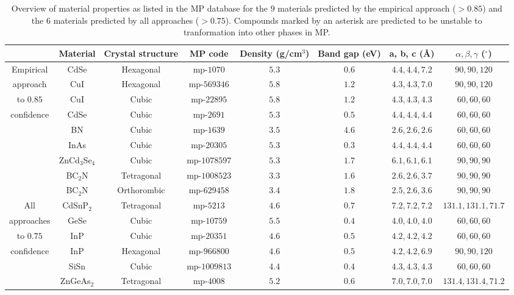 \documentclass[superscriptaddress,unsortedaddress,
 amsmath,amssymb,
 aps,
]{revtex4-2}
\begin{document}
\begin{table}[t]
    \centering 
    \caption{Overview of material properties as listed in the MP database for the $9$ materials predicted by the empirical approach ($>0.85$) and the $6$ materials predicted by all approaches ($>0.75$). Compounds marked by an asterisk are predicted to be unstable to tranformation into other phases in MP. }
    \begin{tabular}{c|c c c c c c c }
      & Material & Crystal structure & MP code & Density (g/cm$^3$) & Band gap (eV) & a, b, c (\AA) & $\alpha,\beta,\gamma$ ($^\circ$) \\
    \hline 
    Empirical & CdSe & Hexagonal & mp-$1070$ & $5.3$ & $0.6$ & $4.4,4.4,7.2$ & $90,90,120$ \\
    approach  & CuI & Hexagonal & mp-$569346$ & $5.8$ & $1.2$ & $4.3,4.3,7.0$ & $90,90,120$ \\ 
    to $0.85$  & CuI & Cubic & mp-$22895$ & $5.8$ & $1.2$ & $4.3,4.3,4.3$ & $60,60,60$  \\ 
    confidence & CdSe & Cubic & mp-$2691$ & $5.3$ & $0.5$ & $4.4,4.4,4.4$ & $60,60,60$  \\
     & BN & Cubic & mp-$1639$ & $3.5$ & $4.6$ & $2.6,2.6,2.6$ & $60,60,60$  \\
     & InAs & Cubic & mp-$20305$ & $5.3$ & $0.3$ & $4.4,4.4,4.4$ & $60,60,60$ \\
     & ZnCd$_3$Se$_4$ & Cubic & mp-$1078597$ & $5.3$ & $1.7$ & $6.1,6.1,6.1$ & $90,90,90$ \\
     & BC$_2$N & Tetragonal & mp-$1008523$ & $3.3$ & $1.6$ & $2.6,2.6,3.7$ & $90,90,90$ \\
     & BC$_2$N & Orthorombic & mp-$629458$ & $3.4$ & $1.8$ & $2.5,2.6,3.6$ & $90,90,90$ \\
    \hline 
    All & CdSnP$_2$ & Tetragonal & mp-$5213$ & $4.6$ & $0.7$ & $7.2,7.2,7.2$ & $131.1,131.1,71.7$ \\
    approaches & GeSe & Cubic & mp-$10759$ & $5.5$ & $0.4$ & $4.0,4.0,4.0$ & $60,60,60$ \\
    to $0.75$  & InP & Cubic & mp-$20351$ & $4.6$ & $0.5$ & $4.2,4.2,4.2$ &  $60,60,60$\\ 
    confidence & InP & Hexagonal & mp-$966800$ & $4.6$ & $0.5$ & $4.2,4.2,6.9$ & $90,90,120$ \\ 
     & SiSn & Cubic & mp-$1009813$ & $4.4$ & $0.4$ & $4.3,4.3,4.3$ & $60,60,60$ \\
     & ZnGeAs$_2$ & Tetragonal & mp-$4008$ & $5.2$ & $0.6$ & $7.0,7.0,7.0$ & $131.4,131.4,71.2$ \\
    \end{tabular}
    \label{tab:materialproperties}
\end{table}
\end{document}
